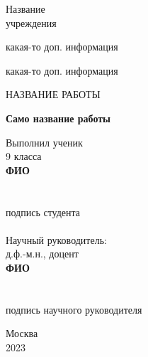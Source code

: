 \begin{titlepage}

\begin{center}{
Название \\ учреждения}

\bigskip

какая-то доп. информация

\bigskip

какая-то доп. информация

\parskip=45pt

НАЗВАНИЕ РАБОТЫ

\parskip=20pt

\textbf{Само название работы}


\vspace{15mm}
\end{center}
\vfill
\vfill
\newlength{\ML}
\hfill
\begin{flushright}
\begin{minipage}{0.5\textwidth}

\normalsize{Выполнил ученик\\
 9 класса\\
\textbf{ФИО}\\
\\
\underline{\hspace{0.75\textwidth}}\\
подпись студента\\
\\
Научный руководитель:\\
д.ф.-м.н., доцент\\
\textbf{ФИО}\\
\\
\underline{\hspace{0.75\textwidth}}\\
подпись научного руководителя}\\
 \end{minipage}%
\end{flushright}
\vspace{0.25cm}
\vfill
\begin{center}
{\large Москва\\2023}
\end{center}
\end{titlepage}